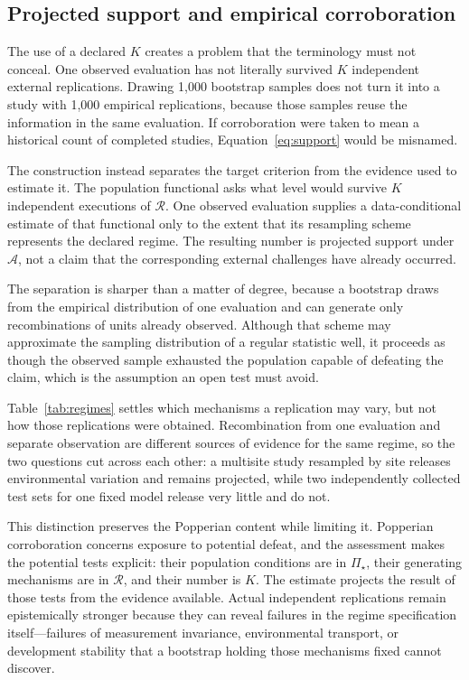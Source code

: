 \documentclass[11pt]{article}
\newcommand{\Regime}{\mathcal{R}}
\newcommand{\Assess}{\mathcal{A}}
\newcommand{\PSet}{\Pi_\star}
\theoremstyle{remark}
\begin{document}
\subsection{Projected support and empirical corroboration}

The use of a declared $K$ creates a problem that the terminology must not conceal. One observed evaluation has not literally survived $K$ independent external replications. Drawing 1,000 bootstrap samples does not turn it into a study with 1,000 empirical replications, because those samples reuse the information in the same evaluation. If corroboration were taken to mean a historical count of completed studies, Equation~\eqref{eq:support} would be misnamed.

The construction instead separates the target criterion from the evidence used to estimate it. The population functional asks what level would survive $K$ independent executions of $\Regime$. One observed evaluation supplies a data-conditional estimate of that functional only to the extent that its resampling scheme represents the declared regime. The resulting number is projected support under $\Assess$, not a claim that the corresponding external challenges have already occurred.

The separation is sharper than a matter of degree, because a bootstrap draws from the empirical distribution of one evaluation and can generate only recombinations of units already observed. Although that scheme may approximate the sampling distribution of a regular statistic well, it proceeds as though the observed sample exhausted the population capable of defeating the claim, which is the assumption an open test must avoid.

Table~\ref{tab:regimes} settles which mechanisms a replication may vary, but not how those replications were obtained. Recombination from one evaluation and separate observation are different sources of evidence for the same regime, so the two questions cut across each other: a multisite study resampled by site releases environmental variation and remains projected, while two independently collected test sets for one fixed model release very little and do not.

This distinction preserves the Popperian content while limiting it. Popperian corroboration concerns exposure to potential defeat, and the assessment makes the potential tests explicit: their population conditions are in $\PSet$, their generating mechanisms are in $\Regime$, and their number is $K$. The estimate projects the result of those tests from the evidence available. Actual independent replications remain epistemically stronger because they can reveal failures in the regime specification itself---failures of measurement invariance, environmental transport, or development stability that a bootstrap holding those mechanisms fixed cannot discover.
\end{document}
